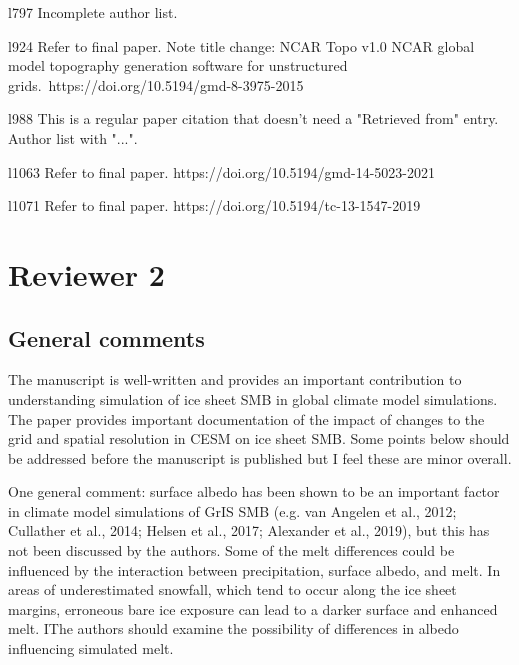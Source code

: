 \documentclass[12pt,oneside,a4paper]{article}%
\begin{document}
{\color{blue}{Done.}} \newline

l797 Incomplete author list. \newline

l924 Refer to final paper. Note title change: NCAR Topo v1.0 NCAR global model topography generation software for unstructured grids. https://doi.org/10.5194/gmd-8-3975-2015 \newline

{\color{blue}{Done.}} \newline

l988 This is a regular paper citation that doesn't need a "Retrieved from" entry. Author list with "...". \newline

l1063 Refer to final paper. https://doi.org/10.5194/gmd-14-5023-2021 \newline

{\color{blue}{Done.}} \newline

l1071 Refer to final paper. https://doi.org/10.5194/tc-13-1547-2019 \newline

{\color{blue}{Done.}}

\section*{Reviewer 2}

\subsection*{General comments}

The manuscript is well-written and provides an important contribution to understanding simulation of ice sheet SMB in global climate model simulations. The paper provides important documentation of the impact of changes to the grid and spatial resolution in CESM on ice sheet SMB. Some points below should be addressed before the manuscript is published but I feel these are minor overall. \newline

One general comment: surface albedo has been shown to be an important factor in climate model simulations of GrIS SMB (e.g. van Angelen et al., 2012; Cullather et al., 2014; Helsen et al., 2017; Alexander et al., 2019), but this has not been discussed by the authors. Some of the melt differences could be influenced by the interaction between precipitation, surface albedo, and melt. In areas of underestimated snowfall, which tend to occur along the ice sheet margins, erroneous bare ice exposure can lead to a darker surface and enhanced melt. IThe authors should examine the possibility of differences in albedo influencing simulated melt. \newline
\end{document}

